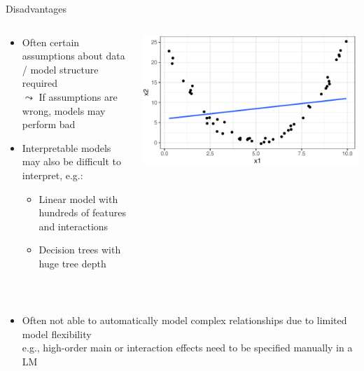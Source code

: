 \documentclass[11pt,compress,t,notes=noshow, aspectratio=169, xcolor=table]{beamer}
\begin{document}
\begin{frame}{Disadvantages}
\begin{columns}
\begin{column}{0.7\textwidth}
    \begin{itemize}%
    \itemsep1em
        \item<1-> Often certain assumptions about data / model structure required\\
        $\leadsto$ If assumptions are wrong, models may perform bad 
        \item<2-> Interpretable models may also be difficult to interpret, e.g.:
    \begin{itemize}
        \item Linear model with hundreds of features and interactions 
        \item Decision trees with huge tree depth
    \end{itemize}
    \end{itemize}
\end{column}
\begin{column}{0.3\textwidth}
    \begin{center}
        \includegraphics[width = \textwidth]{figure/lm_bad_fit.pdf} 
    \end{center}
\end{column}
\end{columns}
\quad \\

\begin{itemize}
\itemsep1em
        \item<3-> 
        Often not able to automatically model complex relationships due to limited model flexibility
        \\
        e.g., high-order main or interaction effects need to be specified manually in a LM


\end{itemize}
\end{frame}
\end{document}
